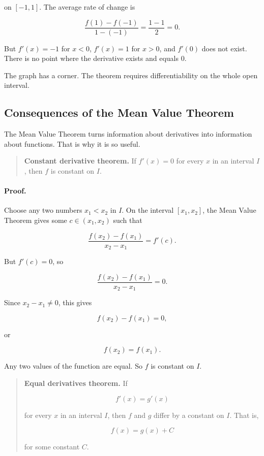 on \([-1,1]\).  The average rate of change is

\[
\frac{f(1)-f(-1)}{1-(-1)}
=
\frac{1-1}{2}
=
0.
\]

But \(f'(x)=-1\) for \(x<0\), \(f'(x)=1\) for \(x>0\), and \(f'(0)\) does not exist.
There is no point where the derivative exists and equals \(0\).

The graph has a corner.  The theorem requires differentiability on the whole open
interval.

\subsection{Consequences of the Mean Value Theorem}
\label{subsec:mvt-consequences}

The Mean Value Theorem turns information about derivatives into information about
functions.  That is why it is so useful.

\begin{quote}
\textbf{Constant derivative theorem.}
If \(f'(x)=0\) for every \(x\) in an interval \(I\), then \(f\) is constant on \(I\).
\end{quote}

\paragraph{Proof.}
Choose any two numbers \(x_1<x_2\) in \(I\).  On the interval \([x_1,x_2]\), the
Mean Value Theorem gives some \(c\in(x_1,x_2)\) such that

\[
\frac{f(x_2)-f(x_1)}{x_2-x_1}=f'(c).
\]

But \(f'(c)=0\), so

\[
\frac{f(x_2)-f(x_1)}{x_2-x_1}=0.
\]

Since \(x_2-x_1\neq0\), this gives

\[
f(x_2)-f(x_1)=0,
\]

or

\[
f(x_2)=f(x_1).
\]

Any two values of the function are equal.  So \(f\) is constant on \(I\).

\begin{quote}
\textbf{Equal derivatives theorem.}
If

\[
f'(x)=g'(x)
\]

for every \(x\) in an interval \(I\), then \(f\) and \(g\) differ by a constant on \(I\).
That is,

\[
f(x)=g(x)+C
\]

for some constant \(C\).
\end{quote}

